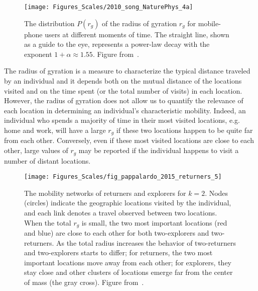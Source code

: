 \begin{figure}[t!]
\centering
\texttt{[image: Figures\_Scales/2010\_song\_NaturePhys\_4a]}
\caption{The distribution $P(r_g)$ of the radius of gyration $r_g$ for mobile-phone users at different moments of time. The straight line, shown as a guide to the eye, represents a power-law decay with the exponent $1+\alpha \approx 1.55$. Figure from~\cite{song_2010_modelling}.}
\label{fig:scales_song_1}
\end{figure}

The radius of gyration is a measure to characterize the typical distance traveled by an individual and it depends both on the mutual distance of the locations visited and on the time spent (or the total number of visits) in each location. 
However, the radius of gyration does not allow us to quantify the relevance of each location in determining an individual's characteristic mobility. Indeed, an individual who spends a majority of time in their most visited locations, e.g. home and work, will have a large $r_g$ if these two locations happen to be quite far from each other. Conversely, even if these most visited locations are close to each other, large values of  $r_g$ may be reported if the individual happens to visit a number of distant locations. 

\begin{figure}[t!]
\centering
\texttt{[image: Figures\_Scales/fig\_pappalardo\_2015\_returners\_5]}
\caption{The mobility networks of returners and explorers for $k = 2$. Nodes (circles) indicate the geographic locations visited by the individual, and each link denotes a travel observed between two locations. When the total $r_g$ is small, the two most important locations (red and blue) are close to each other for both two-explorers and two-returners. As the total radius increases the behavior of two-returners and two-explorers starts to differ; for returners, the two most important locations move away from each other; for explorers, they stay close and other clusters of locations emerge far from the center of mass (the gray cross). Figure from~\cite{pappalardo_2015_returners}.}
\label{fig:scales_pappalardo_2015}
\end{figure}


